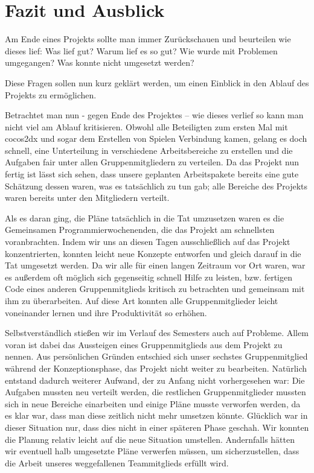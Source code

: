 \chapter{Fazit und Ausblick}\label{ch:fazit}

Am Ende eines Projekts sollte man immer Zurückschauen und beurteilen wie dieses lief: Was lief gut? Warum lief es so gut? Wie wurde mit Problemen umgegangen? Was konnte nicht umgesetzt werden?

Diese Fragen sollen nun kurz geklärt werden, um einen Einblick in den Ablauf des Projekts zu ermöglichen.

\label{sec:6_review}

Betrachtet man nun - gegen Ende des Projektes – wie dieses verlief so kann man nicht viel am Ablauf kritisieren. Obwohl alle Beteiligten zum ersten Mal mit cocos2dx und sogar dem Erstellen von Spielen Verbindung kamen, gelang es doch schnell, eine Unterteilung in verschiedene Arbeitsbereiche zu erstellen und die Aufgaben fair unter allen Gruppenmitgliedern zu verteilen. Da das Projekt nun fertig ist lässt sich sehen, dass unsere geplanten Arbeitspakete bereits eine gute Schätzung dessen waren, was es tatsächlich zu tun gab; alle Bereiche des Projekts waren bereits unter den Mitgliedern verteilt.

Als es daran ging, die Pläne tatsächlich in die Tat umzusetzen waren es die Gemeinsamen Programmierwochenenden, die das Projekt am schnellsten voranbrachten. Indem wir uns an diesen Tagen ausschließlich auf das Projekt konzentrierten, konnten leicht neue Konzepte entworfen und gleich darauf in die Tat umgesetzt werden. Da wir alle für einen langen Zeitraum vor Ort waren, war es außerdem oft möglich sich gegenseitig schnell Hilfe zu leisten, bzw. fertigen Code eines anderen Gruppenmitglieds kritisch zu betrachten und gemeinsam mit ihm zu überarbeiten. Auf diese Art konnten alle Gruppenmitglieder leicht voneinander lernen und ihre Produktivität so erhöhen.

Selbstverständlich stießen wir im Verlauf des Semesters auch auf Probleme. Allem voran ist dabei das Aussteigen eines Gruppenmitglieds aus dem Projekt zu nennen. Aus persönlichen Gründen entschied sich unser sechstes Gruppenmitglied während der Konzeptionsphase, das Projekt nicht weiter zu bearbeiten. Natürlich entstand dadurch weiterer Aufwand, der  zu Anfang nicht vorhergesehen war: Die Aufgaben mussten neu verteilt werden, die restlichen Gruppenmitglieder mussten sich in neue Bereiche einarbeiten und einige Pläne musste verworfen werden, da es klar war, dass man diese zeitlich nicht mehr umsetzen könnte. Glücklich war in dieser Situation nur, dass dies nicht in einer späteren Phase geschah. Wir konnten die Planung relativ leicht auf die neue Situation umstellen. Andernfalls hätten wir eventuell halb umgesetzte Pläne verwerfen müssen, um sicherzustellen, dass die Arbeit unseres weggefallenen Teammitglieds erfüllt wird.

